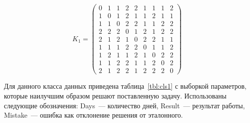 \begin{equation}
	\label{eqn:kd1}
	K_{1} = \begin{pmatrix}
		0 & 1 & 1 & 2 & 2 & 1 & 1 & 1 & 2 \\ 
		1 & 0 & 1 & 2 & 1 & 1 & 2 & 1 & 1 \\ 
		1 & 1 & 0 & 2 & 2 & 1 & 1 & 2 & 2 \\ 
		2 & 2 & 2 & 0 & 1 & 2 & 1 & 2 & 2 \\ 
		2 & 1 & 2 & 1 & 0 & 2 & 2 & 1 & 1 \\ 
		1 & 1 & 1 & 2 & 2 & 0 & 1 & 1 & 2 \\ 
		1 & 2 & 1 & 1 & 2 & 1 & 0 & 2 & 2 \\ 
		1 & 1 & 2 & 2 & 1 & 1 & 2 & 0 & 2 \\ 
		2 & 1 & 2 & 2 & 1 & 2 & 2 & 2 & 0 
	\end{pmatrix}
\end{equation}

Для данного класса данных приведена таблица~\ref{tbl:cls1} с выборкой параметров, которые наилучшим образом решают поставленную задачу. Использованы следующие обозначения: Days~--- количество дней, Result~--- результат работы, Mistake~--- ошибка как отклонение решения от эталонного.

